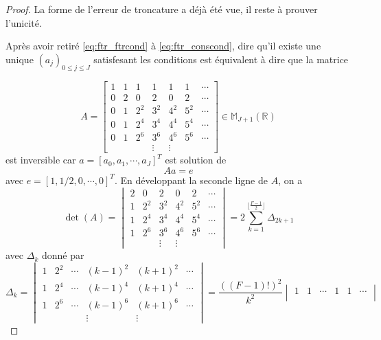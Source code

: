 \begin{proof}
La forme de l'erreur de troncature a déjà été vue, il reste à prouver l'unicité.

Après avoir retiré \eqref{eq:ftr_ftrcond} à \eqref{eq:ftr_conscond}, dire qu'il existe une unique $(a_j)_{0 \leq j \leq J}$ satisfesant les conditions est équivalent à dire que la matrice

\begin{equation}
A=\begin{bmatrix}
1 &  1  &  1  &  1  &  1  &  1  & \cdots\\  
0 &  2  &  0  &  2  &  0  & 2  & \cdots\\
0 &  1  & 2^2 & 3^2 & 4^2 & 5^2 & \cdots\\
0 &  1  & 2^4 & 3^4 & 4^4 & 5^4 & \cdots\\
0 &  1  & 2^6 & 3^6 & 4^6 & 5^6 & \cdots\\
&&& \vdots &  \vdots &
\end{bmatrix} \in \mathbb{M}_{J+1} \left( \mathbb{R} \right)
\end{equation}
est inversible car $a = [a_0, a_1, \cdots, a_J]^T$ est solution de 
\begin{equation}
A a = e
\end{equation}
avec $e = [1,1/2, 0,\cdots,0]^T$. En développant la seconde ligne de $A$, on a
\begin{equation}
\det ( A ) = \begin{vmatrix} 
2  &  0  &  2  &  0  & 2  & \cdots\\
1  & 2^2 & 3^2 & 4^2 & 5^2 & \cdots\\
1  & 2^4 & 3^4 & 4^4 & 5^4 & \cdots\\
1  & 2^6 & 3^6 & 4^6 & 5^6 & \cdots\\
& & \vdots &  \vdots &
\end{vmatrix} = 2 \sum_{k=1}^{\lfloor\frac{F-1}{2}\rfloor} \Delta_{2k+1}
\end{equation}
avec $\Delta_k$ donné par
\begin{equation}
\Delta_k = \begin{vmatrix} 
1 & 2^2 & \cdots & (k-1)^2 & (k+1)^2 & \cdots\\
1 & 2^4 & \cdots & (k-1)^4 & (k+1)^4 & \cdots\\
1 & 2^6 & \cdots & (k-1)^6 & (k+1)^6 & \cdots\\
&&& \vdots &  \vdots &
\end{vmatrix} = \dfrac{((F-1)!)^2}{k^2} \begin{vmatrix} 
1 & 1 & \cdots & 1 & 1 & \cdots\\

\end{vmatrix}
\end{equation}
\end{proof}
